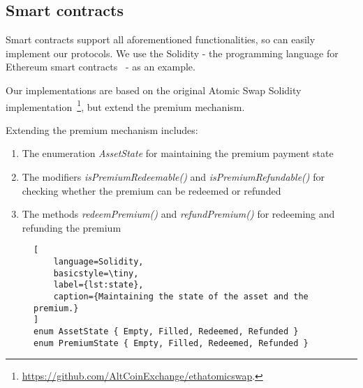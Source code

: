 \subsection{Smart contracts}

Smart contracts support all aforementioned functionalities, so can easily implement our protocols.
We use the Solidity - the programming language for Ethereum smart contracts~\cite{wood2014ethereum} - as an example.

Our implementations are based on the original Atomic Swap Solidity implementation~\footnote{\url{https://github.com/AltCoinExchange/ethatomicswap}.},
but extend the premium mechanism.

Extending the premium mechanism includes:

\begin{enumerate}
    \item The enumeration \textit{AssetState} for maintaining the premium payment state
    \item The modifiers \textit{isPremiumRedeemable()} and \textit{isPremiumRefundable()} for checking whether the premium can be redeemed or refunded
    \item The methods \textit{redeemPremium()} and \textit{refundPremium()} for redeeming and refunding the premium
\end{enumerate}

\begin{figure}[htb]
\begin{lstlisting}[
    language=Solidity, 
    basicstyle=\tiny,
    label={lst:state},
    caption={Maintaining the state of the asset and the premium.}
]
enum AssetState { Empty, Filled, Redeemed, Refunded }
enum PremiumState { Empty, Filled, Redeemed, Refunded }
\end{lstlisting}
\end{figure}

